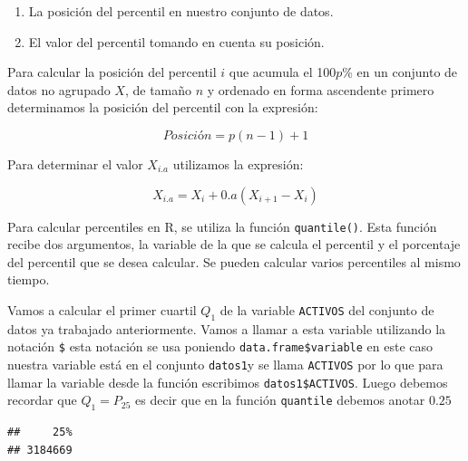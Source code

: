 \documentclass[]{book}
\newenvironment{Shaded}{\begin{snugshade}}{\end{snugshade}}
\newcommand{\KeywordTok}[1]{\textcolor[rgb]{0.13,0.29,0.53}{\textbf{#1}}}
\newcommand{\FloatTok}[1]{\textcolor[rgb]{0.00,0.00,0.81}{#1}}
\newcommand{\OperatorTok}[1]{\textcolor[rgb]{0.81,0.36,0.00}{\textbf{#1}}}
\newcommand{\NormalTok}[1]{#1}
\providecommand{\tightlist}{%
  \setlength{\itemsep}{0pt}\setlength{\parskip}{0pt}}
\begin{document}
\begin{enumerate}
\def\labelenumi{\arabic{enumi}.}
\tightlist
\item
  La posición del percentil en nuestro conjunto de datos.
\item
  El valor del percentil tomando en cuenta su posición.
\end{enumerate}

Para calcular la posición del percentil \(i\) que acumula el 100\(p\)\%
en un conjunto de datos no agrupado \(X\), de tamaño \(n\) y ordenado en
forma ascendente primero determinamos la posición del percentil con la
expresión:

\begin{equation} 
  Posición = p(n-1)+1
  \label{eq:posperc}
\end{equation}

Para determinar el valor \(X_{i.a}\) utilizamos la expresión:

\begin{equation} 
  X_{i.a}=X_{i}+0.a(X_{i+1}-X_{i})
  \label{eq:valperc}
\end{equation}

Para calcular percentiles en R, se utiliza la función
\texttt{quantile()}. Esta función recibe dos argumentos, la variable de
la que se calcula el percentil y el porcentaje del percentil que se
desea calcular. Se pueden calcular varios percentiles al mismo tiempo.

Vamos a calcular el primer cuartil \(Q_{1}\) de la variable
\texttt{ACTIVOS} del conjunto de datos ya trabajado anteriormente. Vamos
a llamar a esta variable utilizando la notación \texttt{\$} esta
notación se usa poniendo \texttt{data.frame\$variable} en este caso
nuestra variable está en el conjunto \texttt{datos1}y se llama
\texttt{ACTIVOS} por lo que para llamar la variable desde la función
escribimos \texttt{datos1\$ACTIVOS}. Luego debemos recordar que
\(Q_1=P_{25}\) es decir que en la función \texttt{quantile} debemos
anotar \(0.25\)

\begin{Shaded}
\end{Shaded}

\begin{verbatim}
##     25% 
## 3184669
\end{verbatim}
\end{document}
